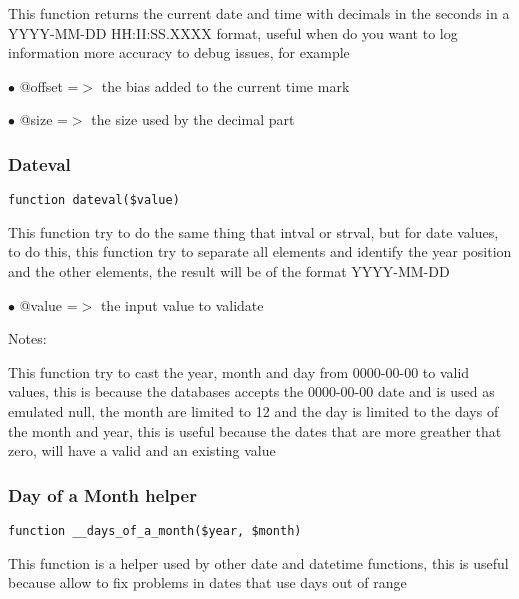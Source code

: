 \documentclass[a4paper]{article}
\begin{document}
This function returns the current date and time with decimals in the seconds
in a YYYY-MM-DD HH:II:SS.XXXX format, useful when do you want to log information
more accuracy to debug issues, for example

\begin{compactitem}
\item[\color{myblue}$\bullet$] @offset =$>$ the bias added to the current time mark
\item[\color{myblue}$\bullet$] @size   =$>$ the size used by the decimal part
\end{compactitem}

\hypertarget{toc102}{}
\subsubsection{Dateval}

\begin{lstlisting}
function dateval($value)
\end{lstlisting}

This function try to do the same thing that intval or strval, but for date
values, to do this, this function try to separate all elements and identify
the year position and the other elements, the result will be of the format
YYYY-MM-DD

\begin{compactitem}
\item[\color{myblue}$\bullet$] @value =$>$ the input value to validate
\end{compactitem}

Notes:

This function try to cast the year, month and day from 0000-00-00 to valid
values, this is because the databases accepts the 0000-00-00 date and is used
as emulated null, the month are limited to 12 and the day is limited to the
days of the month and year, this is useful because the dates that are more
greather that zero, will have a valid and an existing value

\hypertarget{toc103}{}
\subsubsection{Day of a Month helper}

\begin{lstlisting}
function __days_of_a_month($year, $month)
\end{lstlisting}

This function is a helper used by other date and datetime functions, this
is useful because allow to fix problems in dates that use days out of range
\end{document}
